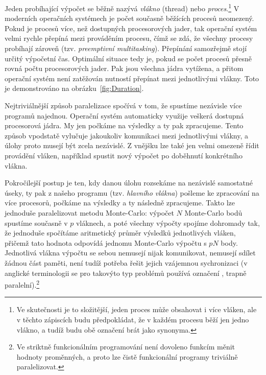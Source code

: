 \documentclass[a4paper,11pt,twoside]{article}
\theoremstyle{red}
\theoremstyle{green}
\begin{document}
    Jeden probíhající výpočet se běžně nazývá \emph{vlákno} (thread) nebo \emph{proces}.\footnote{
        Ve skutečnosti je to složitější, jeden proces může obsahovat i více vláken, ale v těchto zápiscích budu předpokládat, že v každém procesu běží jen jedno vlákno, a tudíž budu obě označení brát jako synonyma.
    }
    V moderních operačních systémech je počet současně běžících procesů neomezený.
    Pokud je procesů více, než dostupných procesorových jader, tak operační systém velmi rychle přepíná mezi prováděním procesu, čímž se zdá, že všechny procesy probíhají zároveň (tzv. \emph{preemptivní multitasking}).
    Přepínání samozřejmě stojí určitý výpočetní čas.
    Optimální situace tedy je, pokud se počet procesů přesně rovná počtu procesorových jader.
    Pak jsou všechna jádra vytížena, a přitom operační systém není zatěžován nutností přepínat mezi jednotlivými vlákny. 
    Toto je demonstrováno na obrázku~\ref{fig:Duration}.
    
    Nejtriviálnější způsob paralelizace spočívá v tom, že spustíme nezávisle více programů najednou.
    Operační systém automaticky využije veškerá dostupná procesorová jádra.
    My jen počkáme na výsledky a ty pak zpracujeme.
    Tento způsob vpodstatě vylučuje jakoukoliv komunikaci mezi jednotlivými vlákny, a úlohy proto musejí být zcela nezávislé.
    Z vnějšku lze také jen velmi omezeně řídit provádění vláken, například spustit nový výpočet po doběhnutí konkrétního vlákna. 

    Pokročilejší postup je ten, kdy danou úlohu rozsekáme na nezávislé samostatné úseky, ty pak z našeho programu (tzv. \emph{hlavního vlákna}) pošleme ke zpracování na více procesorů, počkáme na výsledky a ty následně zpracujeme.
    Takto lze jednoduše paralelizovat metodu Monte-Carlo: výpočet $N$ Monte-Carlo bodů spustíme současně v $p$ vláknech, a poté všechny výpočty spojíme dohromady tak, že jednoduše spočítáme aritmetický průměr výsledků jednotlivých vláken, přičemž tato hodnota odpovídá jednomu Monte-Carlo výpočtu s $pN$ body.
    Jednotlivá vlákna výpočtu se sebou nemusejí nijak komunikovat, nemusejí sdílet žádnou část paměti, není tudíž potřeba řešit jejich vzájemnou sychronizaci (v anglické terminologii se pro takovýto typ problémů používá označení , trapně paralelní).\footnote{
        Ve striktně funkcionálním programování není dovoleno funkcím měnit hodnoty proměnných, a proto lze čistě funkcionální programy triviálně paralelizovat.
    }
    
\end{document}
